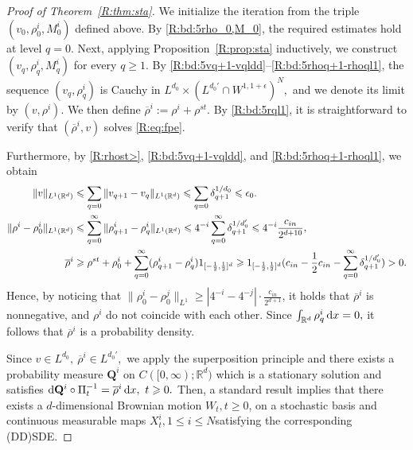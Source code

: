 \documentclass[UTF-8,reqno]{amsart}
\numberwithin{equation}{section}
\theoremstyle{definition}
\def\dif{{\mathord{{\rm d}}}}
\def\geq{\geqslant}
\def\leq{\leqslant}
\def\dif{{\mathord{{\rm d}}}}
\def\geq{\geqslant}
\def\leq{\leqslant}
\begin{document}
 \begin{proof}[Proof of Theorem~\ref{R:thm:sta}]
We initialize the iteration from the triple
$
(v_0,\rho^i_0,M^i_0)
$
defined above.
By \eqref{R:bd:5rho_0,M_0}, the required estimates hold at level $q=0$.
Next, applying Proposition~\ref{R:prop:sta} inductively, we construct
$
(v_q,\rho^i_q,M^i_q)
$
for every
$
q\geq1.
$
By  
\eqref{R:bd:5vq+1-vqldd}--\eqref{R:bd:5rhoq+1-rhoql1}, the sequence
$
 (v_q,\rho^i_q) 
$
is Cauchy in
$
L^{d_0}\times (L^{d_0'}\cap W^{1,1+\epsilon})^N,
$
and we denote its limit by
$
(v,\rho^i).
$ We then define $\overline \rho^i:=\rho^i+\rho^{st}$.
By \eqref{R:bd:5rql1}, it is straightforward to verify that
$
(\overline \rho^i,v)
$
solves \eqref{R:eq:fpe}.

Furthermore, by \eqref{R:rhost>},  
\eqref{R:bd:5vq+1-vqldd}, and
\eqref{R:bd:5rhoq+1-rhoql1}, we obtain
\begin{align}
 \|v \|_{L^{1}(\mathbb{R}^d)}&\leq\sum_{q=0}  \|v_{q+1}-v_{q}\|_{L^{1}(\mathbb{R}^d)}\leq \sum_{q=0}\delta_{q+1}^{1/d_0}
 \leq \epsilon_0.\notag \\
\| \rho^i-\rho_0^i\|_{L^1(\mathbb{R}^d)} 
&\leq
\sum_{q=0}^\infty
\|\rho^i_{q+1}-\rho^i_q\|_{L^1(\mathbb{R}^d)}
\leq
 4^{-i}\sum_{q=0}^\infty
\delta_{q+1}^{1/d_0'}\leq 4^{-i} \frac{c_{in}}{2^{d+10}}
,
\notag\\
\overline\rho^i
&\geq \rho^{st}+
\rho^i_0
+
\sum_{q=0}^\infty
(\rho^i_{q+1}-\rho^i_q)1_{[-\frac12,\frac12]^d}
\geq
1_{[-\frac12,\frac12]^d}(c_{in}-\frac1 2 c_{in}
-
\sum_{q=0}^\infty
\delta_{q+1}^{1/d_0'})
>0.
\notag
\end{align}
Hence, by noticing that $\|\rho^i_0-\rho_0^j\|_{L^1}\geq |4^{-i}-4^{-j}|\cdot \frac{c_{in}}{2^{d+1}}$, it holds that $\overline \rho^i$ is nonnegative,  and $\rho^i$
 do not coincide with each other.
Since
$
\int_{\mathbb{R}^d}\rho_q^i\,\dif x=0,
$
it follows that $\overline\rho^i$ is a probability density.


Since
$
v\in L^{d_0},\ 
\overline \rho^i\in L^{d_0'},
$ we apply the superposition principle  \cite{Tre16}
 and there exists a probability measure
$
\mathbf{Q}^i
$
on
$
C([0,\infty);\mathbb{R}^d)
$
which is a stationary solution and satisfies
$
\dif \mathbf{Q}^i\circ\Pi_t^{-1}
=
\overline \rho^i\,\dif x,
\ 
t\geq0.$
Then,  a standard result  implies that there exists a $d$-dimensional Brownian motion $W_t,t\geq0$, on a stochastic basis  and   continuous  measurable maps $X^i_t,1  \leq i\leq N $satisfying the corresponding (DD)SDE.
\end{proof}
\end{document}
